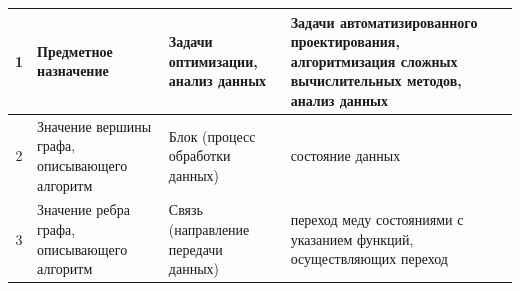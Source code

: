 \begin{landscape}
\begin{longtable}{|c|p{}|p{}|p{}|}
    1          & Предметное назначение                                                                      & Задачи оптимизации, анализ данных                                                                                                                                                                                                                                                                                                                                                                                                                                                                                                                                                                                                                                 & Задачи автоматизированного проектирования, алгоритмизация сложных вычислительных методов, анализ данных                                                                                                                                                                           \\
    \hline
    2          & Значение вершины графа, описывающего алгоритм                                              & Блок (процесс обработки данных)                                                                                                                                                                                                                                                                                                                                                                                                                                                                                                                                                                                                                                   & состояние данных                                                                                                                                                                                                                                                                  \\
    \hline
    3          & Значение ребра графа, описывающего алгоритм                                                & Связь (направление передачи данных)                                                                                                                                                                                                                                                                                                                                                                                                                                                                                                                                                                                                                               & переход меду состояниями с указанием функций, осуществляющих переход                                                                                                                                                                                                              \\

\end{longtable}
\end{landscape}
